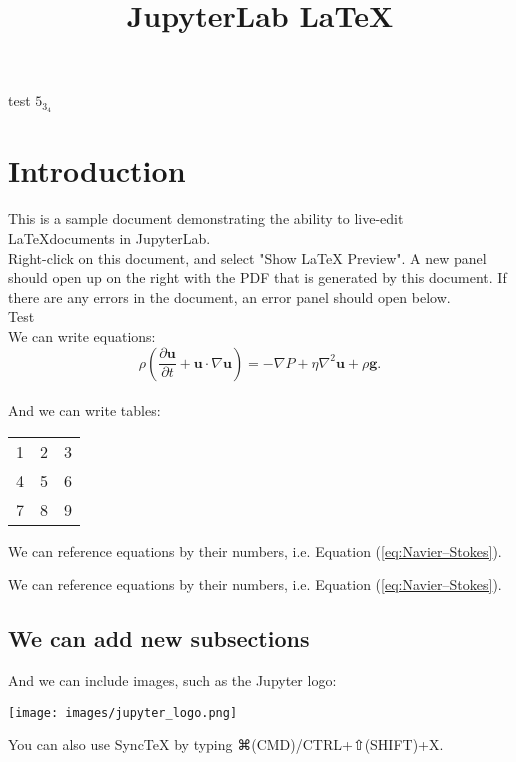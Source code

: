 \documentclass{article}
\begin{document}
\title{JupyterLab \LaTeX}
\date{}
\maketitle
test
$5_{3_{4}}$
\section{Introduction}
This is a sample document demonstrating the ability to live-edit
\LaTeX documents in JupyterLab.
\\
Right-click on this document, and select "Show LaTeX Preview".
A new panel should open up on the right with the PDF that is generated
by this document. If there are any errors in the document, an
error panel should open below.
\\
Test
\\
We can write equations:
\begin{equation}
    \rho \left( \frac{\partial \mathbf{u}}{\partial t} + \mathbf{u} \cdot \nabla \mathbf{u} \right) =
    -\nabla P + \eta \nabla^2 \mathbf{u} + \rho \mathbf{g}.
\label{eq:Navier–Stokes}
\end{equation}
\\
And we can write tables:
\begin{center}
  \begin{tabular}{ | l | c | r| }
    \hline
    1 & 2 & 3 \\ 
    4 & 5 & 6 \\ 
    7 & 8 & 9 \\
    \hline
  \end{tabular}
\end{center}




We can reference equations by their numbers, i.e. Equation (\ref{eq:Navier–Stokes}).


We can reference equations by their numbers, i.e. Equation (\ref{eq:Navier–Stokes}).


\subsection{We can add new subsections}
And we can include images, such as the Jupyter logo:
\begin{center}
  \texttt{[image: images/jupyter\_logo.png]}
\end{center}



\pagebreak


You can also use SyncTeX by typing ⌘(CMD)/CTRL+⇧(SHIFT)+X.
\end{document}
